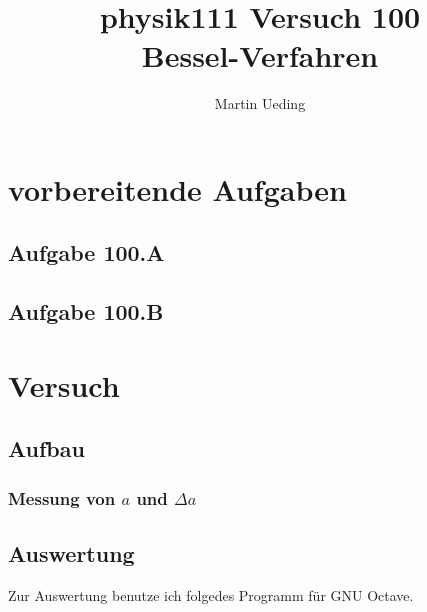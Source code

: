 \documentclass[12pt]{article}
\title{physik111 Versuch 100 \\ Bessel-Verfahren}
\author{Martin Ueding}
\begin{document}
\maketitle

\section{vorbereitende Aufgaben}

\subsection{Aufgabe 100.A}
\subsection{Aufgabe 100.B}

\section{Versuch}

\subsection{Aufbau}

\subsubsection*{Messung von $a$ und $\Delta a$}



\subsection{Auswertung}

Zur Auswertung benutze ich folgedes Programm für GNU Octave.


\end{document}
